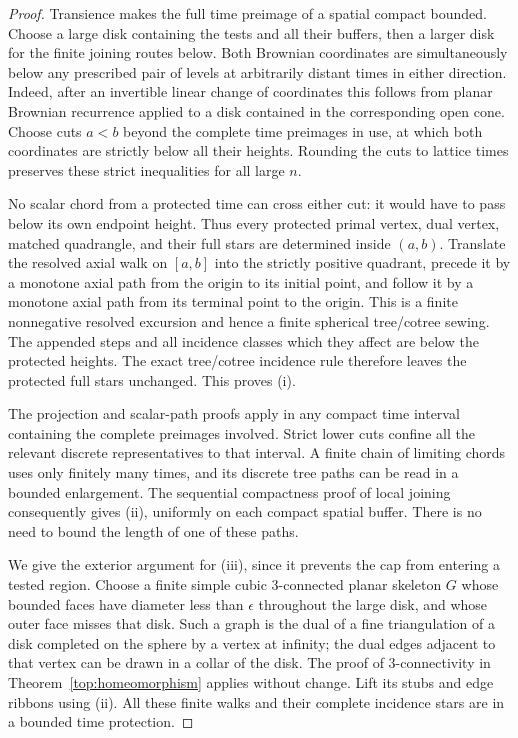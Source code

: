 \documentclass[11pt]{article}
\numberwithin{equation}{section}
\theoremstyle{definition}
\theoremstyle{remark}
\newcommand{\1}{\mathbf 1}
\begin{document}
\begin{proof}
Transience makes the full time preimage of a spatial compact bounded.
Choose a large disk containing the tests and all their buffers, then a
larger disk for the finite joining routes below.  Both Brownian
coordinates are simultaneously below any prescribed pair of levels at
arbitrarily distant times in either direction.  Indeed, after an
invertible linear change of coordinates this follows from planar
Brownian recurrence applied to a disk contained in the corresponding
open cone.  Choose cuts $a<b$ beyond the complete time preimages in
use, at which both coordinates are strictly below all their heights.
Rounding the cuts to lattice times preserves these strict inequalities
for all large $n$.

No scalar chord from a protected time can cross either cut: it would
have to pass below its own endpoint height.  Thus every protected
primal vertex, dual vertex, matched quadrangle, and their full stars
are determined inside $(a,b)$.  Translate the resolved axial walk on
$[a,b]$ into the strictly positive quadrant, precede it by a monotone
axial path from the origin to its initial point, and follow it by a
monotone axial path from its terminal point to the origin.  This is a
finite nonnegative resolved excursion and hence a finite spherical
tree/cotree sewing.  The appended steps and all incidence classes
which they affect are below the protected heights.  The exact
tree/cotree incidence rule therefore leaves the protected full stars
unchanged.  This proves (i).

The projection and scalar-path proofs apply in any compact time
interval containing the complete preimages involved.  Strict lower
cuts confine all the relevant discrete representatives to that
interval.  A finite chain of limiting chords uses only finitely many
times, and its discrete tree paths can be read in a bounded enlargement.
The sequential compactness proof of local joining consequently gives
(ii), uniformly on each compact spatial buffer.  There is no need to
bound the length of one of these paths.

We give the exterior argument for (iii), since it prevents the cap
from entering a tested region.  Choose a finite simple cubic
$3$-connected planar skeleton $G$ whose bounded faces have diameter
less than $\epsilon$ throughout the large disk, and whose outer face
misses that disk.  Such a graph is the dual of a fine triangulation
of a disk completed on the sphere by a vertex at infinity; the dual
edges adjacent to that vertex can be drawn in a collar of the disk.
The proof of $3$-connectivity in Theorem~\ref{top:homeomorphism}
applies without change.  Lift its stubs and edge ribbons using (ii).
All these finite walks and their complete incidence stars are in a
bounded time protection.


\end{proof}
\end{document}
